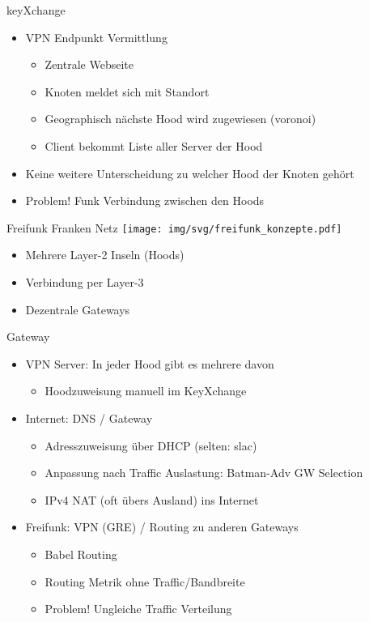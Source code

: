 \begin{frame}{keyXchange}
    \begin{itemize}
        \item VPN Endpunkt Vermittlung
        \begin{itemize}
            \item Zentrale Webseite 
            \item Knoten meldet sich mit Standort
            \item Geographisch nächste Hood wird zugewiesen (voronoi)
            \item Client bekommt Liste aller Server der Hood
        \end{itemize}
        \item Keine weitere Unterscheidung zu welcher Hood der Knoten gehört
        \item<2> {\color{red}Problem!} Funk Verbindung zwischen den Hoods
    \end{itemize}
\end{frame}

\begin{frame}{Freifunk Franken Netz}
    \texttt{[image: img/svg/freifunk\_konzepte.pdf]}

    \begin{itemize}
        \item Mehrere Layer-2 Inseln (Hoods)
        \item Verbindung per Layer-3
        \item Dezentrale Gateways
    \end{itemize}
\end{frame}


\begin{frame}{Gateway}
    \begin{itemize}
        \item VPN Server: In jeder Hood gibt es mehrere davon
        \begin{itemize}
            \item Hoodzuweisung manuell im KeyXchange
        \end{itemize}
        \item Internet: DNS / Gateway
        \begin{itemize}
            \item Adresszuweisung über DHCP (selten: slac)
            \item Anpassung nach Traffic Auslastung: Batman-Adv GW Selection
            \item IPv4 NAT (oft übers Ausland) ins Internet
        \end{itemize}
        \item Freifunk: VPN (GRE) / Routing zu anderen Gateways
        \begin{itemize}
            \item Babel Routing
            \item Routing Metrik ohne Traffic/Bandbreite
            \item<2> {\color{red}Problem!} Ungleiche Traffic Verteilung
        \end{itemize}
    \end{itemize}
\end{frame}
